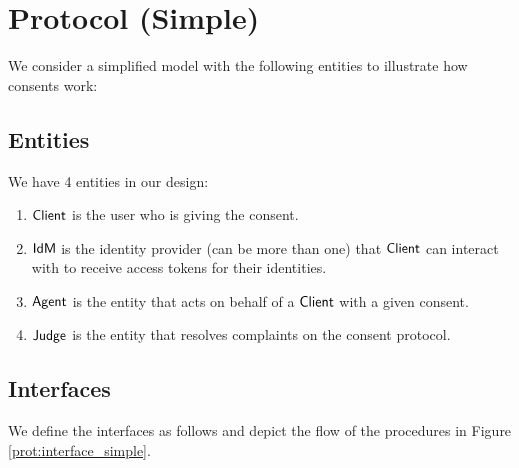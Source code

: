 

\section{Protocol (Simple)}
We consider a simplified model with the following entities to illustrate how consents work:

\subsection{Entities}
We have 4 entities in our design:
\begin{enumerate}
    \item $\textsf{Client}$ is the user who is giving the consent.
    \item $\textsf{IdM}$ is the identity provider (can be more than one) that $\textsf{Client}$ can interact with to receive access tokens for their identities.
    \item $\textsf{Agent}$ is the entity that acts on behalf of a $\textsf{Client}$ with a given consent.
    \item $\textsf{Judge}$ is the entity that resolves complaints on the consent protocol.
\end{enumerate}

\subsection{Interfaces}

We define the interfaces as follows and depict the flow of the procedures in Figure \ref{prot:interface_simple}.

